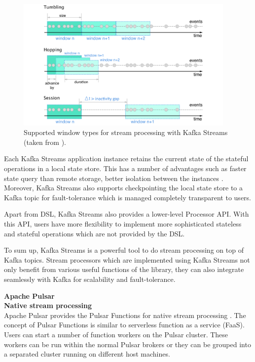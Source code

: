 \begin{figure}[h]
	\centering
	\includegraphics[width=\linewidth,height=6.5cm]{images/window-types.png}
	\caption{Supported window types for stream processing with Kafka Streams (taken from \cite{windowtypes}).}
	\label{fig:windowtypes}
\end{figure}

Each Kafka Streams application instance retains the current state of the stateful operations in a local state store. This has a number of advantages such as faster state query than remote storage, better isolation between the instances \cite{localstatestore}. Moreover, Kafka Streams also supports checkpointing the local state store to a Kafka topic for fault-tolerance which is managed completely transparent to users.

Apart from DSL, Kafka Streams also provides a lower-level Processor API. With this API, users have more flexibility to implement more sophisticated stateless and stateful operations which are not provided by the DSL. 

To sum up, Kafka Streams is a powerful tool to do stream processing on top of Kafka topics. Stream processors which are implemented using Kafka Streams not only benefit from various useful functions of the library, they can also integrate seamlessly with Kafka for scalability and fault-tolerance.





\large \textbf{Apache Pulsar}\\
\normalsize
\textbf{Native stream processing}\\
Apache Pulsar provides the Pulsar Functions for native stream processing \cite{pulsarfunction}. The concept of Pulsar Functions is similar to serverless function as a service (FaaS). Users can start a number of function workers on the Pulsar cluster. These workers can be run within the normal Pulsar brokers or they can be grouped into a separated cluster running on different host machines. 

